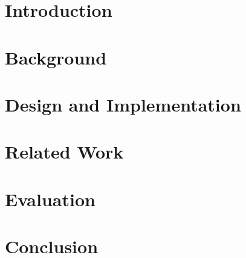 \documentclass[12pt,a4paper]{report}
\begin{document}



\blankpage



\afterpage{\blankpage}



\afterpage{\blankpage}

\tableofcontents
\listoffigures

\clearpage


\chapter{Introduction}



\chapter{Background}



\chapter{Design and Implementation}



\chapter{Related Work}



\chapter{Evaluation}



\chapter{Conclusion}



\printbibliography
\end{document}
